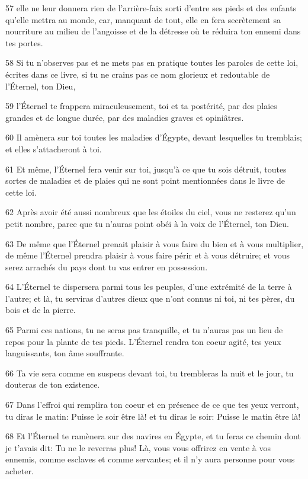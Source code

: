 \par 57 elle ne leur donnera rien de l'arrière-faix sorti d'entre ses pieds et des enfants qu'elle mettra au monde, car, manquant de tout, elle en fera secrètement sa nourriture au milieu de l'angoisse et de la détresse où te réduira ton ennemi dans tes portes.
\par 58 Si tu n'observes pas et ne mets pas en pratique toutes les paroles de cette loi, écrites dans ce livre, si tu ne crains pas ce nom glorieux et redoutable de l'Éternel, ton Dieu,
\par 59 l'Éternel te frappera miraculeusement, toi et ta postérité, par des plaies grandes et de longue durée, par des maladies graves et opiniâtres.
\par 60 Il amènera sur toi toutes les maladies d'Égypte, devant lesquelles tu tremblais; et elles s'attacheront à toi.
\par 61 Et même, l'Éternel fera venir sur toi, jusqu'à ce que tu sois détruit, toutes sortes de maladies et de plaies qui ne sont point mentionnées dans le livre de cette loi.
\par 62 Après avoir été aussi nombreux que les étoiles du ciel, vous ne resterez qu'un petit nombre, parce que tu n'auras point obéi à la voix de l'Éternel, ton Dieu.
\par 63 De même que l'Éternel prenait plaisir à vous faire du bien et à vous multiplier, de même l'Éternel prendra plaisir à vous faire périr et à vous détruire; et vous serez arrachés du pays dont tu vas entrer en possession.
\par 64 L'Éternel te dispersera parmi tous les peuples, d'une extrémité de la terre à l'autre; et là, tu serviras d'autres dieux que n'ont connus ni toi, ni tes pères, du bois et de la pierre.
\par 65 Parmi ces nations, tu ne seras pas tranquille, et tu n'auras pas un lieu de repos pour la plante de tes pieds. L'Éternel rendra ton coeur agité, tes yeux languissants, ton âme souffrante.
\par 66 Ta vie sera comme en suspens devant toi, tu trembleras la nuit et le jour, tu douteras de ton existence.
\par 67 Dans l'effroi qui remplira ton coeur et en présence de ce que tes yeux verront, tu diras le matin: Puisse le soir être là! et tu diras le soir: Puisse le matin être là!
\par 68 Et l'Éternel te ramènera sur des navires en Égypte, et tu feras ce chemin dont je t'avais dit: Tu ne le reverras plus! Là, vous vous offrirez en vente à vos ennemis, comme esclaves et comme servantes; et il n'y aura personne pour vous acheter.

